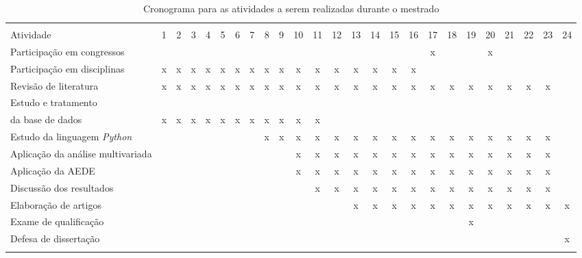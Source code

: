 \documentclass[12pt, a4paper,brazil,oneside]{article}
\begin{document}
	\begin{landscape}
		\begin{table}
			\centering
			\caption{Cronograma para as atividades a serem realizadas durante o mestrado}
			\label{cronograma}
			\begin{tabular}{lcccccccccccccccccccccccc}
				\hline \\[-1.8ex] 
				Atividade & 1 & 2 & 3 & 4 & 5 & 6 & 7 & 8 & 9 & 10 & 11 & 12 & 13 & 14 & 15 & 16 & 17 & 18 & 19 & 20 & 21 & 22 & 23 & 24 \\\hline
				Participação em congressos & & & & & & & & & & & & & & & & & x & & & x & & & & \\
				Participação em disciplinas & x & x & x & x & x & x & x & x & x & x & x & x & x & x & x & x &  &  & & & & & & \\
				Revisão de literatura & x & x & x & x & x & x & x & x & x & x & x & x & x & x & x & x & x & x & x & x & x & x & x &  \\
				Estudo e tratamento \\ da base de dados  & x & x & x & x & x & x & x & x & x & x & x & & & & & & & & & & & & & \\
				Estudo da linguagem \textit{Python} &  &  &  &  &  &  &  & x & x & x & x & x & x & x & x & x & x & x & x & x & x & x & x &  \\
				Aplicação da análise multivariada & & & & & & & & & & x & x & x & x & x & x & x & x & x & x & x & x & x & x & \\
				Aplicação da AEDE & & & & & & & & & & x & x & x & x & x & x & x & x & x & x & x & x & x & x & \\
				Discussão dos resultados & & & & & & & & & & & x & x & x & x & x & x & x & x & x & x & x & x & x & \\
				Elaboração de artigos & & & & & & & & & & & & & x & x & x & x & x & x & x & x & x & x & x & x \\
				Exame de qualificação & & & & & & & & & & & & & & & & & & & x & & & & & \\
				Defesa de dissertação  & & & & & & & & & & & & & & & & & & & & & & & & x \\
				
				\hline \\[-3ex] 
			\end{tabular}
		\end{table}
	\end{landscape}
	
	
\end{document}
